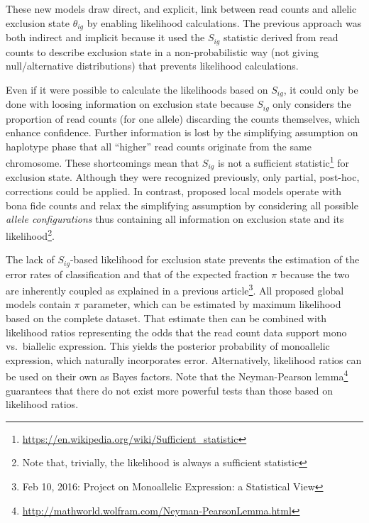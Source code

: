 \documentclass[letterpaper]{article}
\begin{document}
These new models draw direct, and explicit, link between read counts and
allelic exclusion state \(\theta_{ig}\) by enabling likelihood calculations.
The previous approach was both indirect and implicit because it used the
\(S_{ig}\) statistic derived from read counts to describe
exclusion state in a non-probabilistic way (not giving null/alternative
distributions) that prevents likelihood calculations.

Even if it were possible to calculate the likelihoods based on \(S_{ig}\), it
could only be done with loosing information on exclusion state because
\(S_{ig}\) only considers the proportion of read counts (for one allele)
discarding the counts themselves, which enhance confidence.  Further
information is lost by the simplifying assumption on haplotype phase that all
``higher'' read counts originate from the same chromosome.  These shortcomings
mean that \(S_{ig}\) is not a sufficient
statistic\footnote{\url{https://en.wikipedia.org/wiki/Sufficient\_statistic}}
for exclusion state.  Although they were recognized previously, only partial,
post-hoc, corrections could be applied.  In contrast, proposed local models
operate with bona fide counts and relax the simplifying assumption by
considering all possible \emph{allele configurations} thus containing all
information on exclusion state and its likelihood\footnote{Note that,
trivially, the likelihood is always a sufficient statistic}.

The lack of \(S_{ig}\)-based likelihood for exclusion state prevents the
estimation of the error rates of classification and that of the expected
fraction \(\pi\) because the two are inherently coupled as explained in a
previous article\footnote{Feb 10, 2016: Project on Monoallelic Expression: a
Statistical View}.  All proposed global models contain \(\pi\) parameter,
which can be estimated by maximum likelihood based on the complete dataset.
That estimate then can be combined with likelihood ratios representing the
odds that the read count data support mono vs.~biallelic expression. This
yields the posterior probability of monoallelic expression, which naturally
incorporates error.  Alternatively, likelihood ratios can be used on their own
as Bayes factors.  Note that the Neyman-Pearson lemma\footnote{\url{http://mathworld.wolfram.com/Neyman-PearsonLemma.html}} guarantees that there
do not exist more powerful tests than those based on likelihood ratios.
\end{document}
